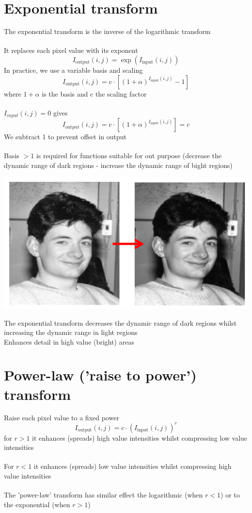 \documentclass{article}[18pt]
\begin{document}
\section{Exponential transform}
The exponential transform is the inverse of the logarithmic transform\\
\\
It replaces each pixel value with its exponent
\[
I_{\text {output}}(i, j)=\exp \left(I_{\text {input}}(i, j)\right)
\]
In practice, we use a variable basis and scaling
\[
I_{\text {output}}(i, j)=\mathrm{c} \cdot\left[(1+\alpha)^{I_{\text {input}}(i, j)}-1\right]
\]
where $1+\alpha$ is the basis and c the scaling factor\\
\\
$I_{input}(i,j)=0$ gives
\[
I_{\text {output}}(i, j)=\mathrm{c} \cdot\left[(1+\alpha)^{I_{\text {input}}(i, j)}\right]=c
\]
We subtract 1 to prevent offset in output\\
\\
Basis $>1$ is required for functions suitable for out purpose (decrease the dynamic range of dark regions - increase the dynamic range of bight regions)
\begin{center}
	\includegraphics[scale=0.7]{exp}
\end{center}
The exponential transform decreases the dynamic range of dark regions whilst increasing the dynamic range in light regions\\
Enhances detail in high value (bright) areas
\section{Power-law ('raise to power') transform}
Raise each pixel value to a fixed power
\[
I_{\text {output}}(i, j)=c \cdot\left(I_{\text {input}}(i, j)\right)^{r}
\]
for $r>1$ it enhances (spreads) high value intensities whilst compressing low value intensities\\
\\
For $r<1$ it enhances (spreads) low value intensities whilst compressing high value intensities\\
\\
The 'power-law' transform has similar effect the logarithmic (when $r<1$) or to the exponential (when $r>1$)
\end{document}
